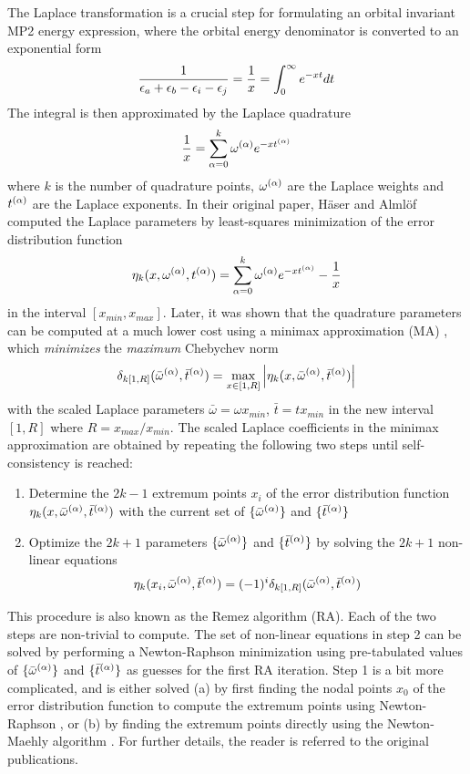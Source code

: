 The Laplace transformation is  a crucial step for formulating an orbital invariant MP2 energy expression, where the orbital energy denominator is converted to an exponential form 
\begin{equation}
\frac{1}{\epsilon_a + \epsilon_b - \epsilon_i - \epsilon_j } = \frac{1}{x} = \int_0^{\infty} e^{-xt} dt
\end{equation} 
\noindent The integral is then approximated by the Laplace quadrature
\begin{equation}
\frac{1}{x} = \sum_{\alpha = 0}^{k} \omega^{(\alpha)} e^{-xt^{(\alpha)}}  
\end{equation}
\noindent where $k$ is the number of quadrature points, $\omega^{(\alpha)}$ are the Laplace weights and $t^{(\alpha)}$ are the Laplace exponents. In their original paper, Häser and Almlöf \cite{Has1992} computed the Laplace parameters by least-squares minimization of the error distribution function
\begin{equation}
\eta_k (x,\omega^{(\alpha)},t^{(\alpha)}) = \sum_{\alpha = 0}^k \omega^{(\alpha)} e^{-xt^{(\alpha)}} - \frac{1}{x}
\end{equation}
\noindent in the interval $[x_{min},x_{max}]$. Later, it was shown that the quadrature parameters can be computed at a much lower cost using a minimax approximation (MA) \cite{Tak2008}, which \emph{minimizes} the \emph{maximum} Chebychev norm
\begin{equation}
\delta_{k[1,R]}(\bar{\omega}^{(\alpha)},\bar{t}^{(\alpha)}) = \max_{x \in [1,R]} \left\lvert \eta_k (x,\bar{\omega}^{(\alpha)},\bar{t}^{(\alpha)} ) \right\rvert 
\end{equation}
\noindent with the scaled Laplace parameters $\bar{\omega} = \omega x_{min}$, $\bar{t} = t x_{min}$  in the new interval $[1,R]$ where $R = x_{max}/x_{min}$. The scaled Laplace coefficients in the minimax approximation are obtained by repeating the following two steps until self-consistency is reached:
\begin{enumerate}
\item Determine the $2k-1$ extremum points $x_i$ of the error distribution function \\ 
$\eta_k (x,\bar{\omega}^{(\alpha)},\bar{t}^{(\alpha)})$ with the current set of $\{\bar{\omega}^{(\alpha)}\}$ and $\{\bar{t}^{(\alpha)}\}$
\item Optimize the $2k+1$ parameters $\{\bar{\omega}^{(\alpha)}\}$ and $\{\bar{t}^{(\alpha)}\}$ by solving the $2k+1$ non-linear equations
\begin{equation}
\eta_k (x_i,\bar{\omega}^{(\alpha)},\bar{t}^{(\alpha)}) = (-1)^i \delta_{k[1,R]}(\bar{\omega}^{(\alpha)},\bar{t}^{(\alpha)})
\end{equation} 
\end{enumerate}
\noindent This procedure is also known as the Remez algorithm (RA). Each of the two steps are non-trivial to compute. The set of non-linear equations in step 2 can be solved by performing a Newton-Raphson minimization using pre-tabulated values of $\{\bar{\omega}^{(\alpha)}\}$ and $\{\bar{t}^{(\alpha)}\}$ as guesses for the first RA iteration. Step 1 is a bit more complicated, and is either solved (a) by first finding the nodal points $x_0$ of the error distribution function to compute the extremum points using Newton-Raphson \cite{Tak2008}, or (b) by finding the extremum points directly using the Newton-Maehly algorithm \cite{Hel2016}. For further details, the reader is referred to the original publications.

